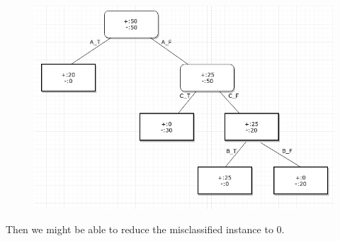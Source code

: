 \documentclass[11pt]{article}
\makeatletter
\def\maxwidth{\ifdim\Gin@nat@width>\linewidth\linewidth
    \else\Gin@nat@width\fi}
\let\Oldincludegraphics\includegraphics
\renewcommand{\includegraphics}[1]{\Oldincludegraphics[width=.8\maxwidth]{#1}}
\makeatother
\begin{document}
\begin{figure}[H]
	\centering
	\includegraphics{5.png}
	\caption{}
\end{figure}

Then we might be able to reduce the misclassified instance to 0.

    
    
    
    
\end{document}
